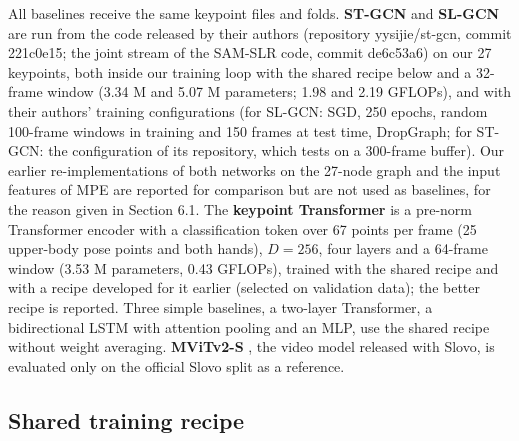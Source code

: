 \documentclass[a4paper,fleqn]{cas-dc}
\begin{document}
All baselines receive the same keypoint files and folds. \textbf{ST-GCN} \cite{2018_yan_stgcn} and \textbf{SL-GCN} \cite{2021_jiang_sam_slr} are run from the code released by their authors (repository yysijie/st-gcn, commit 221c0e15; the joint stream of the SAM-SLR code, commit de6c53a6) on our 27 keypoints, both inside our training loop with the shared recipe below and a 32-frame window (3.34 M and 5.07 M parameters; 1.98 and 2.19 GFLOPs), and with their authors' training configurations (for SL-GCN: SGD, 250 epochs, random 100-frame windows in training and 150 frames at test time, DropGraph; for ST-GCN: the configuration of its repository, which tests on a 300-frame buffer). Our earlier re-implementations of both networks on the 27-node graph and the input features of MPE are reported for comparison but are not used as baselines, for the reason given in Section 6.1. The \textbf{keypoint Transformer} is a pre-norm Transformer encoder \cite{2017_vaswani_attention} with a classification token over 67 points per frame (25 upper-body pose points and both hands), \(D = 256\), four layers and a 64-frame window (3.53 M parameters, 0.43 GFLOPs), trained with the shared recipe and with a recipe developed for it earlier (selected on validation data); the better recipe is reported. Three simple baselines, a two-layer Transformer, a bidirectional LSTM with attention pooling and an MLP, use the shared recipe without weight averaging. \textbf{MViTv2-S} \cite{2022_li_mvitv2}, the video model released with Slovo, is evaluated only on the official Slovo split as a reference.

\hypertarget{shared-training-recipe}{%
\subsection{Shared training recipe}\label{shared-training-recipe}}
\end{document}
